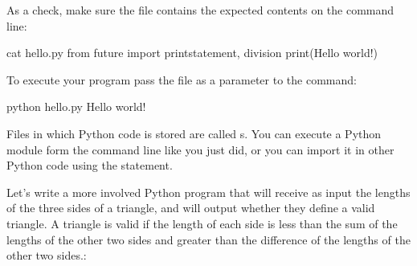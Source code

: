 As a check, make sure the file contains the expected contents on the
command line:

\begin{sphinxVerbatim}[commandchars=\\\{\}]
\PYGZdl{} cat hello.py
from \PYGZus{}\PYGZus{}future\PYGZus{}\PYGZus{} import print\PYGZus{}statement, division
print(\PYGZdq{}Hello world!\PYGZdq{})
\end{sphinxVerbatim}

To execute your program pass the file as a parameter to the 
command:

\begin{sphinxVerbatim}[commandchars=\\\{\}]
\PYGZdl{} python hello.py
Hello world!
\end{sphinxVerbatim}

Files in which Python code is stored are called s. You can
execute a Python module form the command line like you just did, or
you can import it in other Python code using the  statement.

Let's write a more involved Python program that will receive as input
the lengths of the three sides of a triangle, and will output whether
they define a valid triangle. A triangle is valid if the length of
each side is less than the sum of the lengths of the other two sides
and greater than the difference of the lengths of the other two sides.:

